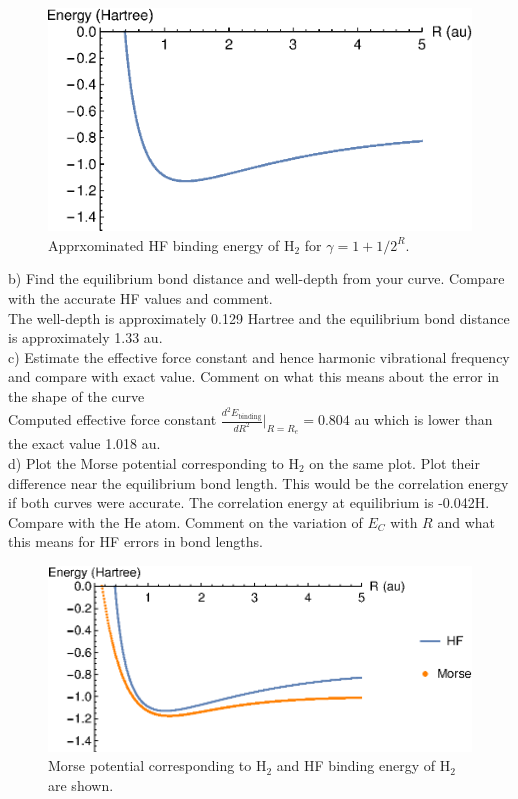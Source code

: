 \documentclass{article}
\begin{document}
\begin{figure}[H]
  \centering
  \includegraphics[scale=0.75]{hf_energy.eps}
  \caption{Apprxominated HF binding energy of H$_2$ for
    $\gamma=1+1/2^R$.}
\end{figure}

\noindent b) Find the equilibrium bond distance and well-depth from your curve.
Compare with the accurate HF values and comment.
\\

{\color{blue}
    The well-depth is approximately 0.129 Hartree and the equilibrium bond
    distance is approximately 1.33 au.}
\\
  
\noindent c) Estimate the effective force constant and hence harmonic vibrational
frequency and compare with exact value. Comment on what this means about the error
in the shape of the curve
\\

{\color{blue}
  Computed effective force constant $\frac{d^2E_{\text{binding}}}{dR^2}\bigg|_{R=R_e}=0.804$
  au which is lower than the exact value 1.018 au.
}
\\

\noindent d) Plot the Morse potential corresponding to H$_2$ on the same plot. Plot
their difference near the equilibrium bond length. This would be the correlation
energy if both curves were accurate. The correlation energy at equilibrium is -0.042H.
Compare with the He atom. Comment on the variation of $E_C$ with $R$ and what this
means for HF errors in bond lengths.
\\

\begin{figure}[H]
  \centering
  \includegraphics[scale=1]{hf_morse_comp.eps}
  \caption{Morse potential corresponding to H$_2$ and HF binding energy
  of H$_2$ are shown.}
\end{figure}
\end{document}
